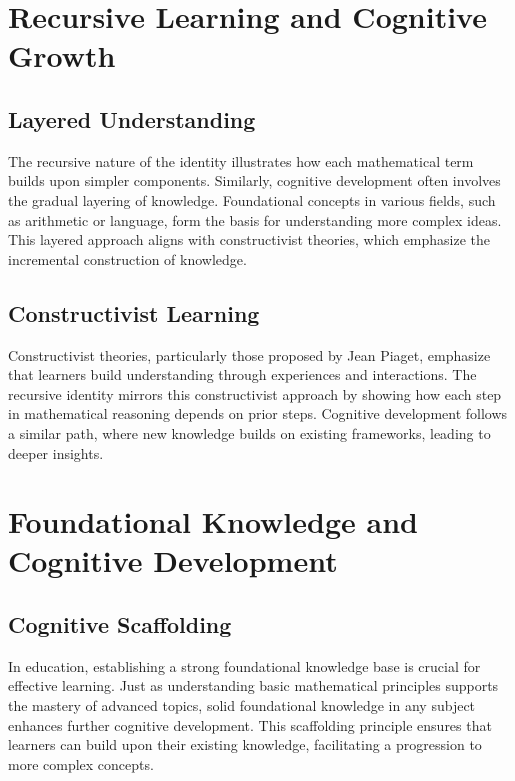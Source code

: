 \documentclass{article}
\begin{document}
\section{Recursive Learning and Cognitive Growth}

\subsection{Layered Understanding}

The recursive nature of the identity illustrates how each mathematical term builds upon simpler components. Similarly, cognitive development often involves the gradual layering of knowledge. Foundational concepts in various fields, such as arithmetic or language, form the basis for understanding more complex ideas. This layered approach aligns with constructivist theories, which emphasize the incremental construction of knowledge.

\subsection{Constructivist Learning}

Constructivist theories, particularly those proposed by Jean Piaget, emphasize that learners build understanding through experiences and interactions. The recursive identity mirrors this constructivist approach by showing how each step in mathematical reasoning depends on prior steps. Cognitive development follows a similar path, where new knowledge builds on existing frameworks, leading to deeper insights.

\section{Foundational Knowledge and Cognitive Development}

\subsection{Cognitive Scaffolding}

In education, establishing a strong foundational knowledge base is crucial for effective learning. Just as understanding basic mathematical principles supports the mastery of advanced topics, solid foundational knowledge in any subject enhances further cognitive development. This scaffolding principle ensures that learners can build upon their existing knowledge, facilitating a progression to more complex concepts.
\end{document}
